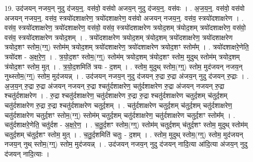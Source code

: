\documentclass[17pt]{extarticle}
\begin{document}
19. उद॑जयन् नजय॒न् नुदु द॑जय॒न्॒. वस॑वो॒ वस॑वो अजय॒न् नुदु द॑जय॒न्॒. वस॑वः । . अ॒ज॒य॒न्॒. वस॑वो॒ वस॑वो अजयन् नजय॒न्॒. वस॑व॒ स्त्रयो॑दशाक्षरेण॒ त्रयो॑दशाक्षरेण॒ वस॑वो अजयन् नजय॒न्॒. वस॑व॒ स्त्रयो॑दशाक्षरेण । . वस॑व॒ स्त्रयो॑दशाक्षरेण॒ त्रयो॑दशाक्षरेण॒ वस॑वो॒ वस॑व॒ स्त्रयो॑दशाक्षरेण त्रयोद॒शम् त्र॑योद॒शम् त्रयो॑दशाक्षरेण॒ वस॑वो॒ वस॑व॒ स्त्रयो॑दशाक्षरेण त्रयोद॒शम् । . त्रयो॑दशाक्षरेण त्रयोद॒शम् त्र॑योद॒शम् त्रयो॑दशाक्षरेण॒ त्रयो॑दशाक्षरेण त्रयोद॒शꣳ स्तोम॒(ग्ग्॒) स्तोम॑म् त्रयोद॒शम् त्रयो॑दशाक्षरेण॒ त्रयो॑दशाक्षरेण त्रयोद॒शꣳ स्तोम᳚म् । . त्रयो॑दशाक्षरे॒णेति॒ त्रयो॑दश - अ॒क्ष॒रे॒ण॒ । . त्र॒यो॒द॒शꣳ स्तोम॒(ग्ग्॒) स्तोम॑म् त्रयोद॒शम् त्र॑योद॒शꣳ स्तोम॒ मुदुथ् स्तोम॑म् त्रयोद॒शम् त्र॑योद॒शꣳ स्तोम॒ मुत् । . त्र॒यो॒द॒शमिति॑ त्रयः - द॒शम् । . स्तोम॒ मुदुथ् स्तोम॒(ग्ग्॒) स्तोम॒ मुद॑जयन् नजय॒न् नुथ्स्तोम॒(ग्ग्॒) स्तोम॒ मुद॑जयन्न् । . उद॑जयन् नजय॒न् नुदु द॑जयन् रु॒द्रा रु॒द्रा अ॑जय॒न् नुदु द॑जयन् रु॒द्राः । . अ॒ज॒य॒न् रु॒द्रा रु॒द्रा अ॑जयन् नजयन् रु॒द्रा श्चतु॑र्दशाक्षरेण॒ चतु॑र्दशाक्षरेण रु॒द्रा अ॑जयन् नजयन् रु॒द्रा श्चतु॑र्दशाक्षरेण । . रु॒द्रा श्चतु॑र्दशाक्षरेण॒ चतु॑र्दशाक्षरेण रु॒द्रा रु॒द्रा श्चतु॑र्दशाक्षरेण चतुर्द॒शम् च॑तुर्द॒शम् चतु॑र्दशाक्षरेण रु॒द्रा रु॒द्रा श्चतु॑र्दशाक्षरेण चतुर्द॒शम् । . चतु॑र्दशाक्षरेण चतुर्द॒शम् च॑तुर्द॒शम् चतु॑र्दशाक्षरेण॒ चतु॑र्दशाक्षरेण चतुर्द॒शꣳ स्तोम॒(ग्ग्॒) स्तोम॑म् चतुर्द॒शम् चतु॑र्दशाक्षरेण॒ चतु॑र्दशाक्षरेण चतुर्द॒शꣳ स्तोम᳚म् । . चतु॑र्दशाक्षरे॒णेति॒ चतु॑र्दश - अ॒क्ष॒रे॒ण॒ । . च॒तु॒र्द॒शꣳ स्तोम॒(ग्ग्॒) स्तोम॑म् चतुर्द॒शम् च॑तुर्द॒शꣳ स्तोम॒ मुदुथ् स्तोम॑म् चतुर्द॒शम् च॑तुर्द॒शꣳ स्तोम॒ मुत् । . च॒तु॒र्द॒शमिति॑ चतुः - द॒शम् । . स्तोम॒ मुदुथ् स्तोम॒(ग्ग्॒) स्तोम॒ मुद॑जयन् नजय॒न् नुथ् स्तोम॒(ग्ग्॒) स्तोम॒ मुद॑जयन्न् । . उद॑जयन् नजय॒न् नुदु द॑जयन् नादि॒त्या आ॑दि॒त्या अ॑जय॒न् नुदु द॑जयन् नादि॒त्याः । \newline
\end{document}
